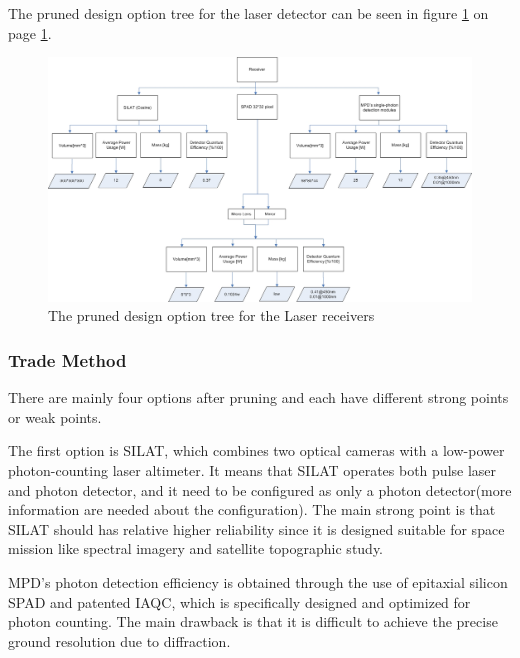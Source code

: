 The pruned design option tree for the laser detector can be seen in figure \ref{fig:PrunedReceiver} on page \ref{fig:PrunedReceiver}.

\begin{figure}
\centering
\includegraphics[scale=0.7, angle=90]{chapters/img/DOTreceiverPruned.jpg}
\caption{The pruned design option tree for the Laser receivers}
\label{fig:PrunedReceiver}
\end{figure}

\subsubsection{Trade Method}
\label{TOReceiverM}
There are mainly four options after pruning and each have different strong points or weak points. 

The first option is \ac{SILAT}, which combines two optical cameras with a low-power photon-counting laser altimeter. It means that \acs{SILAT} operates both pulse laser and photon detector, and it need to be configured as only a photon detector(more information are needed about the configuration). The main strong point is that \acs{SILAT} should has relative higher reliability since it is designed suitable for space mission like spectral imagery and satellite topographic study. 

\ac{MPD}'s photon detection efficiency is obtained through the use of epitaxial silicon \ac{SPAD} and patented \ac{IAQC}, which is specifically designed and optimized for photon counting. The main drawback is that it is difficult to achieve the precise ground resolution due to diffraction.

